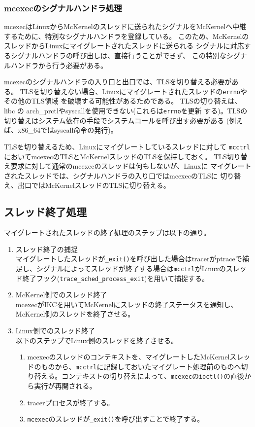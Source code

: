 \documentclass[twoside,11pt,fleqn]{book}
\begin{document}

\subsubsection{mcexecのシグナルハンドラ処理}

mcexecはLinuxからMcKernelのスレッドに送られたシグナルをMcKernelへ中継
するために、特別なシグナルハンドラを登録している。
このため、McKernelのスレッドからLinuxにマイグレートされたスレッドに送られる
シグナルに対応するシグナルハンドラの呼び出しは、直接行うことができず、
この特別なシグナルハンドラから行う必要がある。

mcexecのシグナルハンドラの入り口と出口では、TLSを切り替える必要がある。
TLSを切り替えない場合、Linuxにマイグレートされたスレッドの\texttt{errno}やその他のTLS領域
を破壊する可能性があるためである。
TLSの切り替えは、libc の arch\_prctlやsyscallを使用できない(これらは\texttt{errno}を更新
する)。TLSの切り替えはシステム依存の手段でシステムコールを呼び出す必要がある
(例えば、x86\_64ではsyscall命令の発行)。

TLSを切り替えるため、Linuxにマイグレートしているスレッドに対して
\texttt{mcctrl}においてmcexecのTLSとMcKernelスレッドのTLSを保持しておく。
TLS切り替え要求に対して通常のmcexecのスレッドは何もしないが、Linuxに
マイグレートされたスレッドでは、シグナルハンドラの入り口ではmcexecのTLSに
切り替え、出口ではMcKernelスレッドのTLSに切り替える。

\subsection{スレッド終了処理}
マイグレートされたスレッドの終了処理のステップは以下の通り。
\begin{enumerate}
\item スレッド終了の捕捉\\
マイグレートしたスレッドが\texttt{\_exit()}を呼び出した場合はtracerがptraceで補足し、シグナルによってスレッドが終了する場合は\texttt{mcctrl}がLinuxのスレッド終了フック(\texttt{trace\_sched\_process\_exit})を用いて捕捉する。
\item McKernel側でのスレッド終了\\
mcexecがIKCを用いてMcKernelにスレッドの終了ステータスを通知し、McKernel側のスレッドを終了させる。
\item Linux側でのスレッド終了\\
以下のステップでLinux側のスレッドを終了させる。
\begin{enumerate}
\item mcexecのスレッドのコンテキストを、マイグレートしたMcKernelスレッドのものから、\texttt{mcctrl}に記録しておいたマイグレート処理前のものへ切り替える。コンテキストの切り替えによって、\texttt{mcexec}の\texttt{ioctl()}の直後から実行が再開される。
\item tracerプロセスが終了する。
\item \texttt{mcexec}のスレッドが\texttt{\_exit()}を呼び出すことで終了する。
\end{enumerate}
\end{enumerate}
\end{document}
